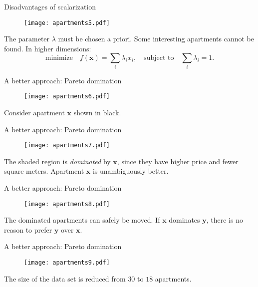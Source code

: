 \documentclass[11pt, aspectratio=149]{beamer}
\theoremstyle{plain}
\begin{document}
\begin{frame}[fragile, t]{Disadvantages of scalarization}
	\begin{figure}
		\centering
		\texttt{[image: apartments5.pdf]}
	\end{figure}
	The parameter $\lambda$ must be chosen a priori.
	Some interesting apartments cannot be found.
	In higher dimensions:
	\begin{equation*}
	\text{minimize} \quad f(\mathbf{x}) = \sum_i \lambda_i x_i, \quad \text{subject to} \quad \sum_i \lambda_i = 1.
	\end{equation*}
	\vfill
\end{frame}

\begin{frame}[fragile, t]{A better approach: Pareto domination}
	\begin{figure}
		\centering
		\texttt{[image: apartments6.pdf]}
	\end{figure}
	Consider apartment $\mathbf{x}$ shown in black.
\end{frame}

\begin{frame}[fragile, t]{A better approach: Pareto domination}
	\begin{figure}
		\centering
		\texttt{[image: apartments7.pdf]}
	\end{figure}
	The shaded region is \emph{dominated} by $\mathbf{x}$, since they have higher price and fewer square meters.
	Apartment $\mathbf{x}$ is unambiguously better. 
\end{frame}

\begin{frame}[fragile, t]{A better approach: Pareto domination}
	\begin{figure}
		\centering
		\texttt{[image: apartments8.pdf]}
	\end{figure}
	The dominated apartments can safely be moved.
	If $\mathbf{x}$ dominates $\mathbf{y}$, there is no reason to prefer $\mathbf{y}$ over $\mathbf{x}$.
\end{frame}

\begin{frame}[fragile, t]{A better approach: Pareto domination}
	\begin{figure}
		\centering
		\texttt{[image: apartments9.pdf]}
	\end{figure}
	The size of the data set is reduced from $30$ to $18$ apartments.
\end{frame}
\end{document}
